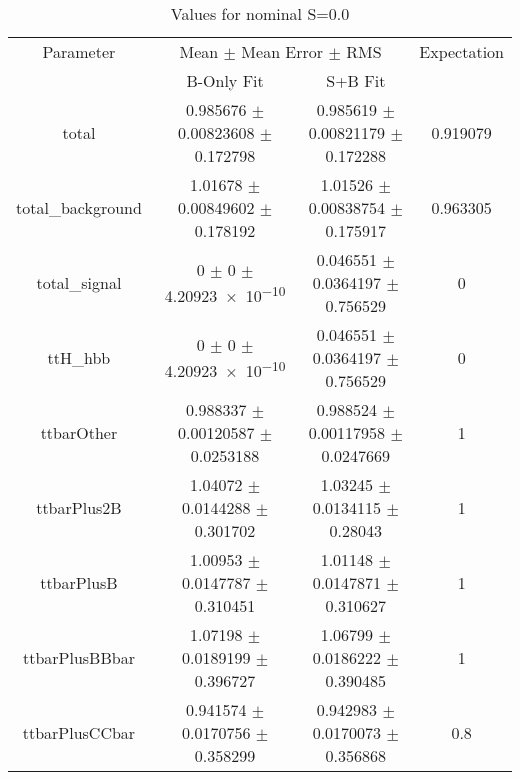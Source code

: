 \begin{table}
\centering
\caption{Values for nominal S=0.0}
\begin{tabular}{cccc}
\toprule
Parameter & \multicolumn{2}{c}{Mean $\pm$ Mean Error $\pm$ RMS} & Expectation\\
 & B-Only Fit & S+B Fit & \\
\midrule
total & \num{0.985676} $\pm$ \num{0.00823608} $\pm$ \num{0.172798} & \num{0.985619} $\pm$ \num{0.00821179} $\pm$ \num{0.172288} & \num{0.919079}\\
total\_background & \num{1.01678} $\pm$ \num{0.00849602} $\pm$ \num{0.178192} & \num{1.01526} $\pm$ \num{0.00838754} $\pm$ \num{0.175917} & \num{0.963305}\\
total\_signal & \num{0} $\pm$ \num{0} $\pm$ \num{4.20923e-10} & \num{0.046551} $\pm$ \num{0.0364197} $\pm$ \num{0.756529} & \num{0}\\
ttH\_hbb & \num{0} $\pm$ \num{0} $\pm$ \num{4.20923e-10} & \num{0.046551} $\pm$ \num{0.0364197} $\pm$ \num{0.756529} & \num{0}\\
ttbarOther & \num{0.988337} $\pm$ \num{0.00120587} $\pm$ \num{0.0253188} & \num{0.988524} $\pm$ \num{0.00117958} $\pm$ \num{0.0247669} & \num{1}\\
ttbarPlus2B & \num{1.04072} $\pm$ \num{0.0144288} $\pm$ \num{0.301702} & \num{1.03245} $\pm$ \num{0.0134115} $\pm$ \num{0.28043} & \num{1}\\
ttbarPlusB & \num{1.00953} $\pm$ \num{0.0147787} $\pm$ \num{0.310451} & \num{1.01148} $\pm$ \num{0.0147871} $\pm$ \num{0.310627} & \num{1}\\
ttbarPlusBBbar & \num{1.07198} $\pm$ \num{0.0189199} $\pm$ \num{0.396727} & \num{1.06799} $\pm$ \num{0.0186222} $\pm$ \num{0.390485} & \num{1}\\
ttbarPlusCCbar & \num{0.941574} $\pm$ \num{0.0170756} $\pm$ \num{0.358299} & \num{0.942983} $\pm$ \num{0.0170073} $\pm$ \num{0.356868} & \num{0.8}\\
\bottomrule
\end{tabular}
\end{table}